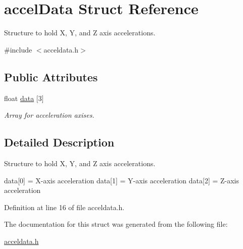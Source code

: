 \hypertarget{structaccelData}{}\section{accel\+Data Struct Reference}
\label{structaccelData}


Structure to hold X, Y, and Z axis accelerations.  




{\ttfamily \#include $<$acceldata.\+h$>$}

\subsection*{Public Attributes}
\begin{DoxyCompactItemize}
\item 
float \hyperlink{structaccelData_a948f355eaced2b4fd39db770ebacee5e}{data} \mbox{[}3\mbox{]}\hypertarget{structaccelData_a948f355eaced2b4fd39db770ebacee5e}{}\label{structaccelData_a948f355eaced2b4fd39db770ebacee5e}

\begin{DoxyCompactList}\small\item\em Array for acceleration axises. \end{DoxyCompactList}\end{DoxyCompactItemize}


\subsection{Detailed Description}
Structure to hold X, Y, and Z axis accelerations. 

data\mbox{[}0\mbox{]} = X-\/axis acceleration data\mbox{[}1\mbox{]} = Y-\/axis acceleration data\mbox{[}2\mbox{]} = Z-\/axis acceleration 

Definition at line 16 of file acceldata.\+h.



The documentation for this struct was generated from the following file\+:\begin{DoxyCompactItemize}
\item 
\hyperlink{acceldata_8h}{acceldata.\+h}\end{DoxyCompactItemize}
